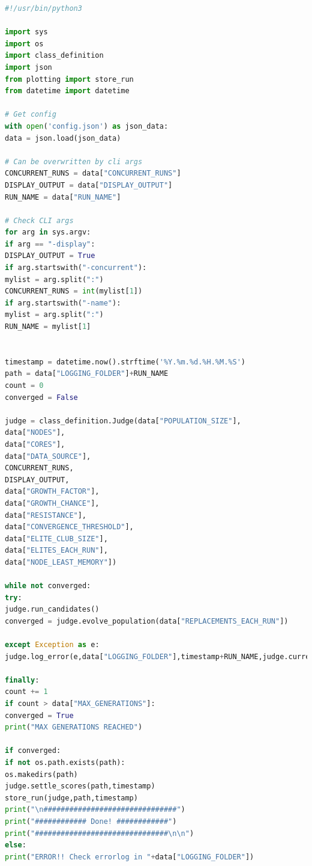 \documentclass[a4paper,english]{report}
\begin{document}
\begin{lstlisting}[language=Python, caption=config.py. The file we run to start a process]
#!/usr/bin/python3

import sys
import os
import class_definition
import json
from plotting import store_run
from datetime import datetime

# Get config
with open('config.json') as json_data:
data = json.load(json_data)

# Can be overwritten by cli args
CONCURRENT_RUNS = data["CONCURRENT_RUNS"]
DISPLAY_OUTPUT = data["DISPLAY_OUTPUT"]
RUN_NAME = data["RUN_NAME"]

# Check CLI args
for arg in sys.argv:
if arg == "-display":
DISPLAY_OUTPUT = True
if arg.startswith("-concurrent"):
mylist = arg.split(":")
CONCURRENT_RUNS = int(mylist[1])
if arg.startswith("-name"):
mylist = arg.split(":")
RUN_NAME = mylist[1]


timestamp = datetime.now().strftime('%Y.%m.%d.%H.%M.%S')
path = data["LOGGING_FOLDER"]+RUN_NAME
count = 0
converged = False

judge = class_definition.Judge(data["POPULATION_SIZE"],
data["NODES"],
data["CORES"],
data["DATA_SOURCE"],
CONCURRENT_RUNS,
DISPLAY_OUTPUT,
data["GROWTH_FACTOR"],
data["GROWTH_CHANCE"],
data["RESISTANCE"],
data["CONVERGENCE_THRESHOLD"],
data["ELITE_CLUB_SIZE"],
data["ELITES_EACH_RUN"],
data["NODE_LEAST_MEMORY"])

while not converged:
try:
judge.run_candidates()
converged = judge.evolve_population(data["REPLACEMENTS_EACH_RUN"])

except Exception as e:
judge.log_error(e,data["LOGGING_FOLDER"],timestamp+RUN_NAME,judge.current_candidate)

finally:
count += 1
if count > data["MAX_GENERATIONS"]:
converged = True
print("MAX GENERATIONS REACHED")

if converged:
if not os.path.exists(path):
os.makedirs(path)
judge.settle_scores(path,timestamp)
store_run(judge,path,timestamp)
print("\n###############################")
print("############ Done! ############")
print("###############################\n\n")
else:
print("ERROR!! Check errorlog in "+data["LOGGING_FOLDER"])
\end{lstlisting}
\end{document}
